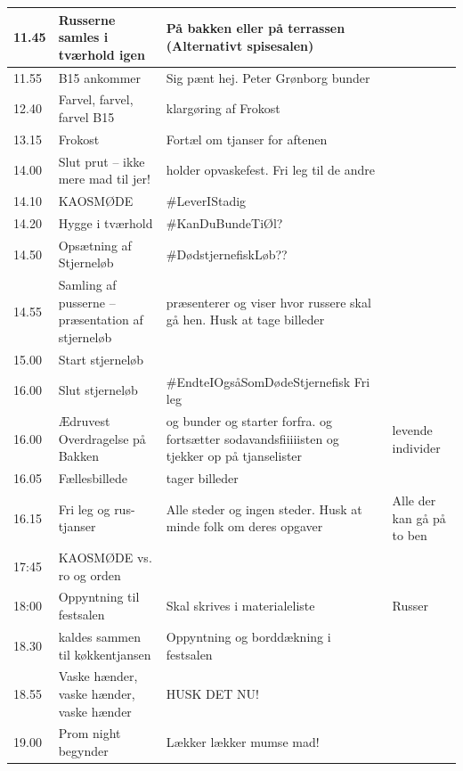 \begin{tabular}{ | p{1cm} | p{4cm} | p{5.5cm} | p{4cm} | }
\hline
	11.45 & Russerne samles i tværhold igen & På bakken eller på terrassen (Alternativt spisesalen) & \Ora \Johnny \Gabriel \\ \hline
	11.55 & B15 ankommer & Sig pænt hej. Peter Grønborg bunder & \BIATCH \KABS \\ \hline
	12.40 & Farvel,  farvel, farvel B15 & \Hippier klargøring af Frokost & \KABS  \Ora \\ \hline
	13.15 & Frokost & Fortæl om tjanser for aftenen & \Hyttebombz{} \Ora \\ \hline
	14.00 & Slut prut – ikke mere mad til jer! & \Bad holder opvaskefest. Fri leg til de andre & \Hyttebombz{} \Johnny \\ \hline
	14.10 & KAOSMØDE & \#LeverIStadig & \Alle \\ \hline
	14.20 & Hygge i tværhold & \#KanDuBundeTiØl? & \Alle \\ \hline
	14.50 & Opsætning af Stjerneløb & \#DødstjernefiskLøb?? & \Alle \\ \hline
	14.55 & Samling af pusserne – præsentation af stjerneløb & \BIATCH \YOLO præsenterer og viser hvor russere skal gå hen. Husk at tage billeder & \Alle \\ \hline
	15.00 & Start stjerneløb &  & \Alle \\ \hline
	16.00 & Slut stjerneløb & \#EndteIOgsåSomDødeStjernefisk Fri leg & \Alle \\ \hline
	16.00 & Ædruvest Overdragelse på Bakken & \YOLO og \BIATCH bunder og starter forfra. \Lucyfar og \Ora fortsætter sodavandsfiiiiisten og tjekker op på tjanselister & \Alle levende individer \\ \hline
	16.05 & Fællesbillede & \KABS tager billeder & \Alle \\ \hline
	16.15 & Fri leg og rus-tjanser & Alle steder og ingen steder. Husk at minde folk om deres opgaver & Alle der kan gå på to ben \\ \hline
	17:45 & KAOSMØDE vs. ro og orden &   & \Alle \\ \hline
	18:00 & Oppyntning til festsalen & Skal skrives i materialeliste & Russer \BIATCH \\ \hline
	18.30 & \Poppere kaldes sammen til køkkentjansen & Oppyntning og borddækning i festsalen & \BIATCH \YOLO \\ \hline
	18.55 & Vaske hænder, vaske hænder, vaske hænder & HUSK DET NU! & \Alle \\ \hline
	19.00 & Prom night begynder & Lækker lækker mumse mad! & \Hyttebombz{} \\ \hline

\end{tabular}
